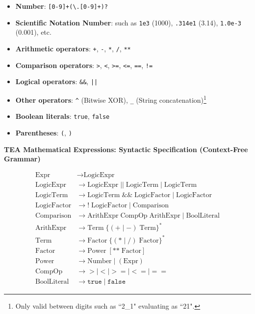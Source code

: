 \documentclass[a4paper, 18pt]{book} %
\begin{document}
{{{{\begin{itemize}
  \item \textbf{Number}: \texttt{[0-9]+(\textbackslash.[0-9]+)?}
  \item \textbf{Scientific Notation Number}: such as \texttt{1e3} (1000), \texttt{.314e1} (3.14), \texttt{1.0e-3} (0.001), etc.
  \item \textbf{Arithmetic operators}: \texttt{+}, \texttt{-}, \texttt{*}, \texttt{/},   \texttt{**}
  \item \textbf{Comparison operators}: \texttt{>}, \texttt{<}, \texttt{>=}, \texttt{<=}, \texttt{==}, \texttt{!=}
  \item \textbf{Logical operators}: \texttt{\&\&}, \texttt{||}
  \item \textbf{Other operators}: \texttt{\^} (Bitwise XOR), \texttt{\_} (String concatenation)\footnote{Only valid between digits such as ``2\_1" evaluating as ``21".}
  \item \textbf{Boolean literals}: \texttt{true}, \texttt{false}
  \item \textbf{Parentheses}: \texttt{(}, \texttt{)}
\end{itemize}

\vspace{1em}

\textbf{TEA Mathematical Expressions: Syntactic Specification (Context-Free Grammar)}

\begin{align*}
\text{Expr} &\rightarrow \text{LogicExpr} \\
\text{LogicExpr} &\rightarrow \text{LogicExpr} \; \texttt{||} \; \text{LogicTerm} \mid \text{LogicTerm} \\
\text{LogicTerm} &\rightarrow \text{LogicTerm} \; \texttt{\&\&} \; \text{LogicFactor} \mid \text{LogicFactor} \\
\text{LogicFactor} &\rightarrow \texttt{!} \; \text{LogicFactor} \mid \text{Comparison} \\
\text{Comparison} &\rightarrow \text{ArithExpr} \; \text{CompOp} \; \text{ArithExpr} \mid \text{BoolLiteral}\\
\text{ArithExpr} &\rightarrow \text{Term} \; \{(+ \mid -) \; \text{Term}\}^* \\
\text{Term} &\rightarrow \text{Factor} \; \{(* \mid /) \; \text{Factor}\}^* \\
\text{Factor} &\rightarrow \text{Power} \; [\text{**{}} \; \text{Factor}] \\
\text{Power} &\rightarrow \text{Number} \mid ( \text{Expr} ) \\
\text{CompOp} &\rightarrow > \mid < \mid >= \mid <= \mid == \\
\text{BoolLiteral} &\rightarrow \texttt{true} \mid \texttt{false}
\end{align*}

}}}}
\end{document}
